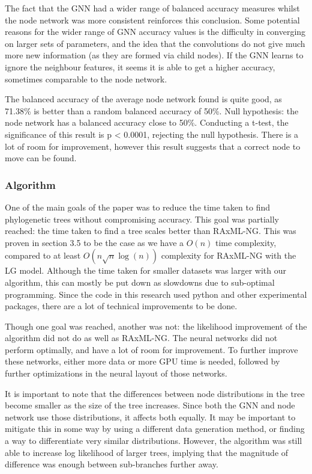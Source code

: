 \documentclass{mpaper}
\begin{document}
The fact that the GNN had a wider range of balanced accuracy measures whilst the node network was more consistent reinforces this conclusion. Some potential reasons for the wider range of GNN accuracy values is the difficulty in converging on larger sets of parameters, and the idea that the convolutions do not give much more new information (as they are formed via child nodes). If the GNN learns to ignore the neighbour features, it seems it is able to get a higher accuracy, sometimes comparable to the node network.

The balanced accuracy of the average node network found is quite good, as 71.38\% is better than a random balanced accuracy of 50\%. Null hypothesis: the node network has a balanced accuracy close to 50\%. Conducting a t-test, the significance of this  result is p < 0.0001, rejecting the null hypothesis. There is a lot of room for improvement, however this result suggests that a correct node to move can be found. 


\subsubsection{Algorithm}

One of the main goals of the paper was to reduce the time taken to find phylogenetic trees without compromising accuracy. This goal was partially reached: the time taken to find a tree scales better than RAxML-NG. This was proven in section 3.5 to be the case as we have a $O(n)$ time complexity, compared to at least $O(n\sqrt{n} \log{(n)}) $ complexity for RAxML-NG with the LG model. Although the time taken for smaller datasets was larger with our algorithm, this can mostly be put down as slowdowns due to sub-optimal programming. Since the code in this research used python and other experimental packages, there are a lot of technical improvements to be done.

Though one goal was reached, another was not: the likelihood improvement of the algorithm did not do as well as RAxML-NG. The neural networks did not perform optimally, and have a lot of room for improvement. To further improve these networks, either more data or more GPU time is needed, followed by further optimizations in the neural layout of those networks.

It is important to note that the differences between node distributions in the tree become smaller as the size of the tree increases. Since both the GNN and node network use those distributions, it affects both equally. It may be important to mitigate this in some way by using a different data generation method, or finding a way to differentiate very similar distributions. However, the algorithm was still able to increase log likelihood of larger trees, implying that the magnitude of difference was enough between sub-branches further away.
\end{document}
